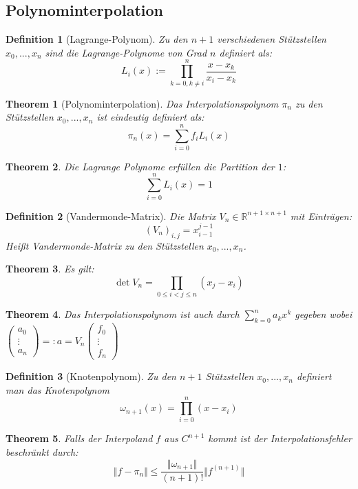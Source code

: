\documentclass[10pt,a4paper]{article}
\newtheorem{theorem}{Theorem}
\newtheorem{definition}{Definition}
\begin{document}
	\subsection{Polynominterpolation}
	\begin{definition}[Lagrange-Polynom]
		Zu den $n+1$ verschiedenen Stützstellen $x_0, ..., x_n$ sind die Lagrange-Polynome von Grad $n$ definiert als:
		$$L_i(x) := \prod_{k=0, k\neq i}^n\frac{x-x_k}{x_i-x_k}$$
	\end{definition}
	\begin{theorem}[Polynominterpolation]
		Das Interpolationspolynom $\pi_n$ zu den Stützstellen $x_0, ..., x_n$ ist eindeutig definiert als:
		$$\pi_n(x) = \sum_{i=0}^{n}f_iL_i(x)$$
	\end{theorem}
	\begin{theorem}
		Die Lagrange Polynome erfüllen die Partition der $1$:
		$$\sum_{i=0}^{n}L_i(x) = 1$$
	\end{theorem}
	\begin{definition}[Vandermonde-Matrix]
		Die Matrix $V_n\in \mathbb{R}^{n+1 \times n+1}$ mit Einträgen:
		$$(V_n)_{i, j} = x_{i-1}^{j-1}$$
		Heißt Vandermonde-Matrix zu den Stützstellen $x_0, ..., x_n$.
	\end{definition}
	\begin{theorem}
		Es gilt:
		$$\det V_n = \prod_{0 \leq i < j\leq n}(x_j-x_i)$$
	\end{theorem}
	\begin{theorem}
		Das Interpolationspolynom ist auch durch $\sum_{k=0}^{n} a_kx^k$ gegeben wobei $\begin{pmatrix}
			a_0\\
			\vdots\\
			a_n
		\end{pmatrix}=: a = V_n\begin{pmatrix}
			f_0\\
			\vdots\\
			f_n
		\end{pmatrix}$
	\end{theorem}
	\begin{definition}[Knotenpolynom]
		Zu den $n+1$ Stützstellen $x_0, ..., x_n$ definiert man das Knotenpolynom 
		$$\omega_{n+1}(x)=\prod_{i=0}^n(x-x_i)$$
	\end{definition}
	\begin{theorem}
		Falls der Interpoland $f$ aus $C^{n+1}$ kommt ist der Interpolationsfehler beschränkt durch:
		$$\Vert f-\pi_n\Vert \leq \frac{\Vert\omega_{n+1}\Vert}{(n+1)!}\Vert f^{(n+1)}\Vert$$
	\end{theorem}
\end{document}
